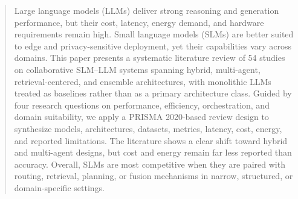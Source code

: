 \begin{abstract}
Large language models (LLMs) deliver strong reasoning and generation performance, but their cost, latency, energy demand, and hardware requirements remain high. Small language models (SLMs) are better suited to edge and privacy-sensitive deployment, yet their capabilities vary across domains. This paper presents a systematic literature review of 54 studies on collaborative SLM--LLM systems spanning hybrid, multi-agent, retrieval-centered, and ensemble architectures, with monolithic LLMs treated as baselines rather than as a primary architecture class. Guided by four research questions on performance, efficiency, orchestration, and domain suitability, we apply a PRISMA 2020-based review design to synthesize models, architectures, datasets, metrics, latency, cost, energy, and reported limitations. The literature shows a clear shift toward hybrid and multi-agent designs, but cost and energy remain far less reported than accuracy. Overall, SLMs are most competitive when they are paired with routing, retrieval, planning, or fusion mechanisms in narrow, structured, or domain-specific settings.

\end{abstract}
